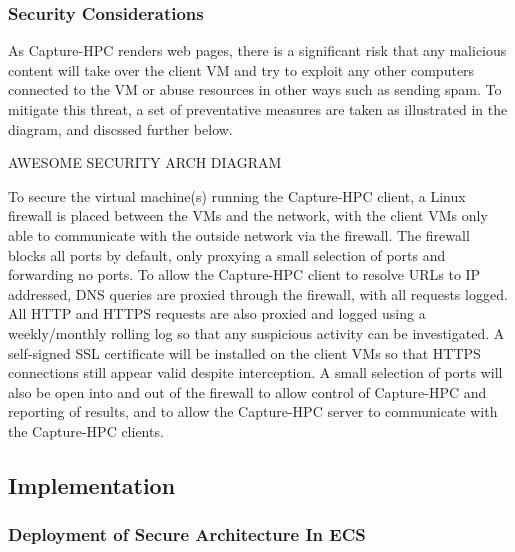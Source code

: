 \subsubsection{Security Considerations}

As Capture-HPC renders web pages, there is a significant risk that any malicious
content will take over the client VM and try to exploit any other computers
connected to the VM or abuse resources in other ways such as sending spam.
To mitigate this threat, a set of preventative measures are taken
as illustrated in the diagram, and discssed further below.

AWESOME SECURITY ARCH DIAGRAM

To secure the virtual machine(s) running the Capture-HPC client, a Linux
firewall is placed between the VMs and the network, with the client VMs only
able to communicate with the outside network via the firewall. The firewall
blocks all ports by default, only proxying a small selection of ports and
forwarding no ports. To allow the Capture-HPC client to resolve URLs to IP
addressed, DNS
queries are proxied through the firewall, with all requests logged. All HTTP and
HTTPS requests are also proxied and logged using a weekly/monthly rolling log
so that any suspicious
activity can be investigated. A self-signed SSL certificate will be installed on
the client VMs so that HTTPS connections still appear valid despite interception.
A small selection of ports will also be open into and out of the firewall to
allow control of Capture-HPC and reporting of results, and to allow the
Capture-HPC server to communicate with the Capture-HPC clients.

\subsection{Implementation}

\subsubsection{Deployment of Secure Architecture In ECS}


